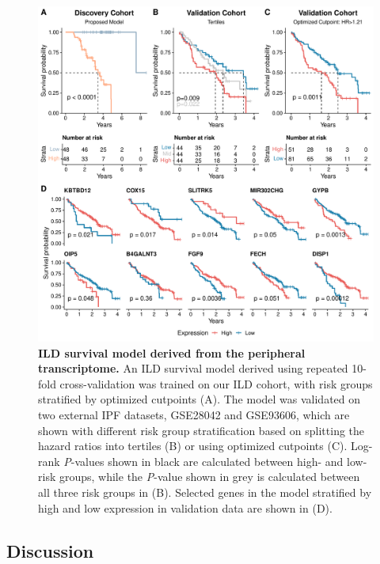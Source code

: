 \documentclass[
]{article}
\begin{document}
\begin{figure}

{\centering \includegraphics[width=0.9\linewidth,]{./Figures/BloodRNAseq/PPF_survival_v2} 

}

\caption[ILD survival model]{\textbf{ILD survival model derived from the peripheral transcriptome.} An ILD survival model derived using repeated 10-fold cross-validation was trained on our ILD cohort, with risk groups stratified by optimized cutpoints (A). The model was validated on two external IPF datasets, GSE28042 and GSE93606, which are shown with different risk group stratification based on splitting the hazard ratios into tertiles (B) or using optimized cutpoints (C). Log-rank \textit{P}-values shown in black are calculated between high- and low- risk groups, while the \textit{P}-value shown in grey is calculated between all three risk groups in (B). Selected genes in the model stratified by high and low expression in validation data are shown in (D).}\label{fig:ildsurvival}
\end{figure}

\subsection{Discussion}\label{discussion-2}
\end{document}
